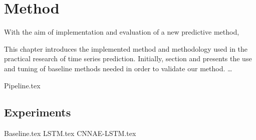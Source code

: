\chapter{Method}
\label{section:Method}

With the aim of implementation and evaluation of a new predictive method,

This chapter introduces the implemented method and methodology used in the practical research of time series prediction.
Initially, section  and  presents the use and tuning of baseline methods needed in order to validate our method.
\dots

{Pipeline.tex}

\section{Experiments}
{Baseline.tex}
{LSTM.tex}
{CNNAE-LSTM.tex}

